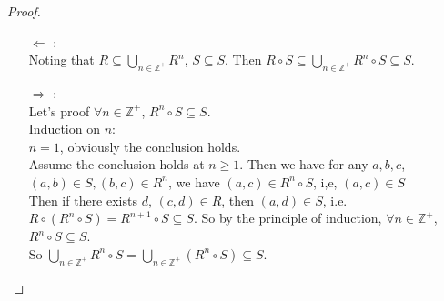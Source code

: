 \documentclass{article}
\begin{document}
\begin{proof} \quad \\
    \begin{itemize}
        \item [$\Leftarrow$]: \\
        Noting that $R \subseteq \bigcup_{n \in \mathbb{Z}^+}R^n$, $S \subseteq S$. Then $R \circ S \subseteq \bigcup_{n \in \mathbb{Z}^+}R^n \circ S \subseteq S$.
        \item [$\Rightarrow$]: \\
        Let's proof $\forall n \in \mathbb{Z}^+$, $R^n \circ S \subseteq S$. \\
        Induction on $n$: \\
        $n = 1$, obviously the conclusion holds. \\
        Assume the conclusion holds at $n \geqslant 1$. Then we have for any $a, b, c$, $(a, b) \in S, (b, c) \in R^n$, we have $(a, c) \in R^n \circ S$, i,e, $(a, c) \in S$ \\
        Then if there exists $d$, $(c, d) \in R$, then $(a, d) \in S$, i.e. $R \circ (R^n \circ S) = R^{n + 1} \circ S \subseteq S$.
        So by the principle of induction, $\forall n \in \mathbb{Z}^+$, $R^n \circ S \subseteq S$. \\
        So $\bigcup_{n \in \mathbb{Z}^+}R^n \circ S = \bigcup_{n \in \mathbb{Z}^+}(R^n \circ S) \subseteq S$.
    \end{itemize}
\end{proof}

\section{}
\end{document}
